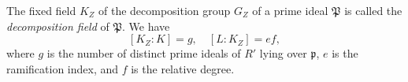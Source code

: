 The fixed field $K_Z$ of the decomposition group $G_Z$ of a prime ideal $\mathfrak{P}$ is called the \textit{decomposition field} of $\mathfrak{P}$. We have
$$[K_Z : K] = g, \quad [L : K_Z] = ef,$$
where $g$ is the number of distinct prime ideals of $R'$ lying over $\mathfrak{p}$, $e$ is the ramification index, and $f$ is the relative degree.
